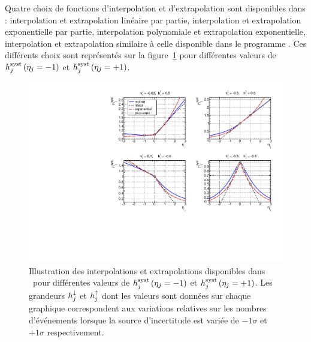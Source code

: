 Quatre choix de fonctions d'interpolation et d'extrapolation sont disponibles dans \opthylic{} : interpolation et extrapolation lin\'eaire par partie, interpolation et extrapolation exponentielle par partie, interpolation polynomiale et extrapolation exponentielle, interpolation et extrapolation similaire \`a celle disponible dans le programme \mclimit.
Ces diff\'erents choix sont repr\'esent\'es sur la figure~\ref{fig:ExampleFunctionsInterExtrap} pour diff\'erentes valeurs de 
$\fsyst_j\left(\eta_j=-1\right)$ et $\fsyst_j\left(\eta_j=+1\right)$.
\vspace{-0.2cm}
\enlargethispage{2.5cm}
\begin{figure}[!htb]
\begin{center}
\includegraphics[scale=0.7]{figures/cFunctionsInterExtrap.pdf}
\caption{Illustration des interpolations et extrapolations disponibles dans \opthylic~pour diff\'erentes valeurs de $\fsyst_j\left(\eta_j=-1\right)$ et $\fsyst_j\left(\eta_j=+1\right)$. Les grandeurs $h^{\downarrow}_j$ et $h^{\uparrow}_j$ dont les valeurs sont donn\'ees sur chaque graphique correspondent aux variations relatives sur les nombres d'\'ev\'enements lorsque la source d'incertitude est vari\'ee de $-1\sigma$ et $+1\sigma$ respectivement.
\label{fig:ExampleFunctionsInterExtrap}}
\end{center}
\end{figure}

